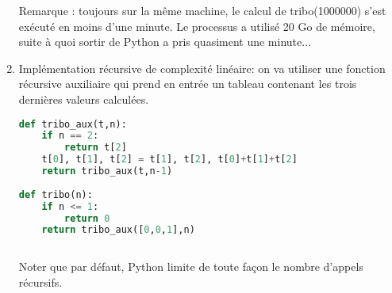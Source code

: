 \documentclass[11pt,a4paper]{article}
\begin{document}
\begin{enumerate}
Remarque : toujours sur la même machine,  le calcul de tribo(1000000) s'est exécuté en moins d'une minute. Le processus a utilisé 20 Go de mémoire, suite à quoi sortir de Python a pris quasiment une minute...


\item Implémentation récursive de complexité linéaire: on va  utiliser une fonction récursive auxiliaire qui prend en entrée un tableau contenant les trois dernières valeurs calculées.
\begin{lstlisting}[language=Python]
def tribo_aux(t,n):
	if n == 2:
		return t[2]
	t[0], t[1], t[2] = t[1], t[2], t[0]+t[1]+t[2]
	return tribo_aux(t,n-1)
	
def tribo(n):
	if n <= 1:
		return 0
	return tribo_aux([0,0,1],n)
	
\end{lstlisting}
Noter que par défaut, Python limite de toute façon le nombre d'appels récursifs.
\end{enumerate}
\end{document}
